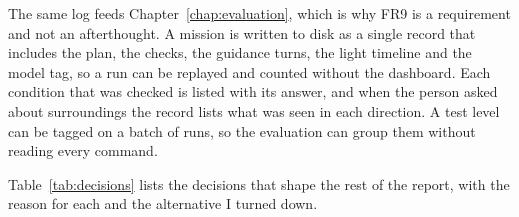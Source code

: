 The same log feeds Chapter~\ref{chap:evaluation}, which is why FR9 is a
requirement and not an afterthought. A mission is written to disk as a single
record that includes the plan, the checks, the guidance turns, the light timeline
and the model tag, so a run can be replayed and counted without the dashboard. Each condition that
was checked is listed with its answer, and when the person asked about
surroundings the record lists what was seen in each direction. A test level can
be tagged on a batch of runs, so the evaluation can group them without reading
every command.

\label{sec:design_decisions}

Table~\ref{tab:decisions} lists the decisions that shape the rest of the report,
with the reason for each and the alternative I turned down.

